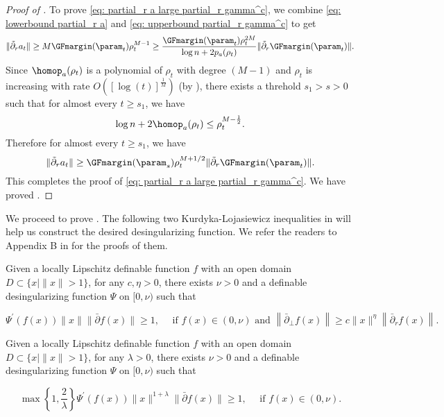 \begin{proof}[Proof of ]
   To prove \eqref{eq: partial_r a large partial_r gamma^c}, we combine \eqref{eq: lowerbound partial_r a} and \eqref{eq: upperbound partial_r gamma^c} to get
\[
    \| \tilde \partial_r a_t\| \ge M \GFmargin(\param_t) \rho_t^{M-1} \ge  \frac{\GFmargin(\param_t) \rho_t^{2M}}{ \log n + 2p_a(\rho_t)} \| \tilde \partial_r \GFmargin(\param_t)\|.
\]
Since $\homop_a(\rho_t)$ is a polynomial of $\rho_t$ with degree $(M-1)$ and $\rho_t$ is increasing with rate $O([\log(t)]^{\frac{1}{M}}) $ (by ), 
there exists a threhold $s_1 >s>0$ such that for almost every $t\ge s_1$, we have 
\[
    \log n + 2 \homop_a(\rho_t) \le \rho_t^{M-\frac{1}{2}}. 
\]
Therefore for almost every $t\ge s_1$, we have
\[
    \| \tilde \partial_r a_t\| \ge  \GFmargin(\param_s) \rho_t^{M+1 /2}  \| \tilde \partial_r \GFmargin(\param_t)\|.
\]
This completes the proof of \eqref{eq: partial_r a large partial_r gamma^c}. 
We have proved .
\end{proof}


We proceed to prove .  The following two Kurdyka-Lojasiewicz inequalities in \citet{ji2020directional} will help us construct the desired desingularizing function. We refer the readers to Appendix B in \citet{ji2020directional} for the proofs of them. 

\begin{lemma}
    \label{lem:KL1}
 Given a locally Lipschitz definable function $f$ with an open domain $D \subset\{x \mid\|x\|>1\}$, for any $c, \eta>0$, there exists $\nu>0$ and a definable desingularizing function $\Psi$ on $[0, \nu)$ such that

$$
\Psi^{\prime}(f(x))\|x\|\|\bar{\partial} f(x)\| \geq 1, \quad \text { if } f(x) \in(0, \nu) \text { and }\left\|\bar{\partial}_{\perp} f(x)\right\| \geq c\|x\|^\eta\left\|\bar{\partial}_r f(x)\right\|. 
$$
\end{lemma}

\begin{lemma} 
    \label{lem:KL2} 
 Given a locally Lipschitz definable function $f$ with an open domain $D \subset\{x \mid\|x\|>1\}$, for any $\lambda>0$, there exists $\nu>0$ and a definable desingularizing function $\Psi$ on $[0, \nu)$ such that

$$
\max \left\{1, \frac{2}{\lambda}\right\} \Psi^{\prime}(f(x))\|x\|^{1+\lambda}\|\bar{\partial} f(x)\| \geq 1, \quad \text { if } f(x) \in(0, \nu). 
$$
\end{lemma}


